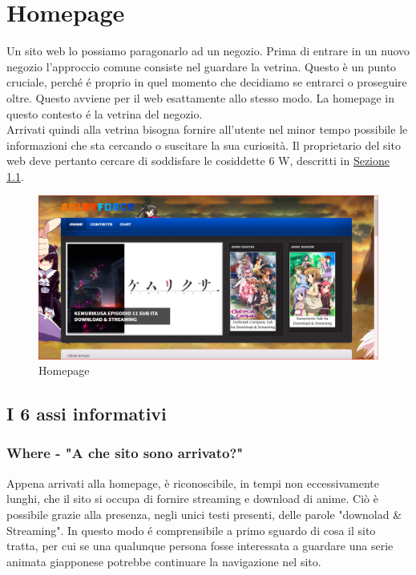 \section{Homepage} \label{Homepage}
Un sito web lo possiamo paragonarlo ad un negozio. Prima di entrare in un nuovo negozio l’approccio comune consiste nel guardare la vetrina. Questo è un punto cruciale, perché é proprio in quel momento che decidiamo se entrarci o proseguire oltre. Questo avviene per il web esattamente allo stesso modo. La homepage in questo contesto é la vetrina del negozio. \\
Arrivati quindi alla vetrina bisogna fornire all'utente nel minor tempo possibile le informazioni che sta cercando o  suscitare la sua curiosità. Il proprietario del sito web deve pertanto cercare di soddisfare le cosiddette 6 W, descritti in \hyperref[Assi informativi]{Sezione \ref{Assi informativi}}. 

\begin{figure}[H]
	\centering 
	\includegraphics[width=1\textwidth]{img/homepage01.png}
	\caption{Homepage} 
	\label{img1} 
\end{figure}

\subsection{I 6 assi informativi} \label{Assi informativi}

\subsubsection{Where - "A che sito sono arrivato?"} \label{HWhere}
Appena arrivati alla homepage, è riconoscibile,  in tempi non eccessivamente lunghi, che il sito si occupa di fornire streaming e download di anime. Ciò è possibile grazie alla presenza, negli unici testi presenti, delle parole "downolad \& Streaming". In questo modo é comprensibile a primo sguardo di cosa il sito tratta, per cui se una qualunque persona fosse interessata a guardare una serie animata giapponese potrebbe continuare la navigazione nel sito.

